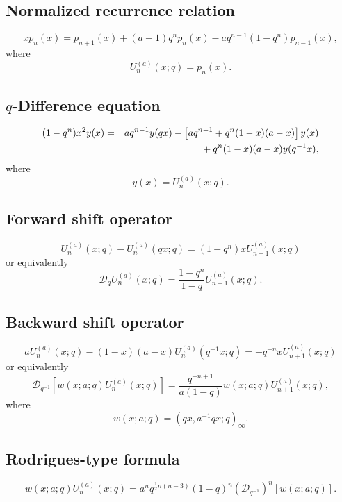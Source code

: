 \documentclass[envcountchap,graybox]{svmono}
\newcommand{\mathindent}{\hspace{7.5mm}}
\begin{document}
{{\subsection*{Normalized recurrence relation}
\begin{equation}
\label{NormRecAlSalamCarlitzI}
xp_n(x)=p_{n+1}(x)+(a+1)q^np_n(x)-aq^{n-1}(1-q^n)p_{n-1}(x),
\end{equation}
where
$$U_n^{(a)}(x;q)=p_n(x).$$

\subsection*{$q$-Difference equation}
\begin{eqnarray}
\label{dvAlSalamCarlitzI}
(1-q^n)x^2y(x)&=&aq^{n-1}y(qx)-\left[aq^{n-1}+q^n(1-x)(a-x)\right]y(x)\nonumber\\
& &{}\mathindent{}+q^n(1-x)(a-x)y(q^{-1}x),
\end{eqnarray}
where
$$y(x)=U_n^{(a)}(x;q).$$

\subsection*{Forward shift operator}
\begin{equation}
\label{shift1AlSalamCarlitzI-I}
U_n^{(a)}(x;q)-U_n^{(a)}(qx;q)=(1-q^n)xU_{n-1}^{(a)}(x;q)
\end{equation}
or equivalently
\begin{equation}
\label{shift1AlSalamCarlitzI-II}
\mathcal{D}_qU_n^{(a)}(x;q)=\frac{1-q^n}{1-q}U_{n-1}^{(a)}(x;q).
\end{equation}

\subsection*{Backward shift operator}
\begin{equation}
\label{shift2AlSalamCarlitzI-I}
aU_n^{(a)}(x;q)-(1-x)(a-x)U_n^{(a)}(q^{-1}x;q)=-q^{-n}xU_{n+1}^{(a)}(x;q)
\end{equation}
or equivalently
\begin{equation}
\label{shift2AlSalamCarlitzI-II}
\mathcal{D}_{q^{-1}}\left[w(x;a;q)U_n^{(a)}(x;q)\right]=
\frac{q^{-n+1}}{a(1-q)}w(x;a;q)U_{n+1}^{(a)}(x;q),
\end{equation}
where
$$w(x;a;q)=(qx,a^{-1}qx;q)_{\infty}.$$

\subsection*{Rodrigues-type formula}
\begin{equation}
\label{RodAlSalamCarlitzI}
w(x;a;q)U_n^{(a)}(x;q)=a^nq^{\frac{1}{2}n(n-3)}(1-q)^n
\left(\mathcal{D}_{q^{-1}}\right)^n\left[w(x;a;q)\right].
\end{equation}

}}
\end{document}
